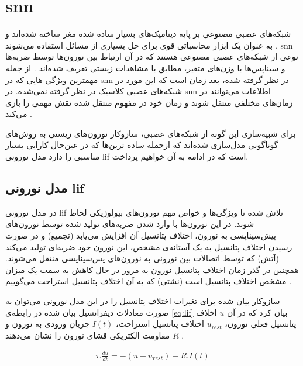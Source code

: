 \documentclass[12pt]{report}
\begin{document}
	
	\section{\gls{snn}}
	شبکه‌های عصبی مصنوعی بر پایه دینامیک‌های بسیار ساده شده مغز ساخته شده‌اند و به عنوان یک ابزار محاسباتی قوی برای حل بسیاری از مسائل استفاده می‌شوند
	\cite{TGNN}. 
	\gls{snn} نوعی از شبکه‌های عصبی مصنوعی هستند که در آن ارتباط بین نورون‌ها توسط ضربه‌ها و سیناپس‌ها  با وزن‌های متغیر، مطابق با مشاهدات زیستی تعریف شده‌اند
	\cite{ghosh2009spiking}. 
	از جمله مهمترین ویژگی هایی که در \gls{snn} در نظر گرفته شده، بعد زمان است
	\cite{Mozafari2019}
	که این مورد در شبکه‌های عصبی کلاسیک در نظر گرفته نمی‌شده. در \gls{snn} اطلاعات می‌توانند در زمان‌های مختلفی منتقل شوند و زمان خود در مفهوم منتقل شده نقش مهمی را بازی می‌کند
	\cite{SNN1997}.
	
	برای شبیه‌سازی این گونه از شبکه‌های عصبی، سازوکار نورون‌های زیستی به روش‌‌های گوناگونی مدل‌سازی شده‌اند که ازجمله ساده ترین‌ها که در عین‌حال کارایی بسیار مناسبی را دارد مدل نورونی \gls{lif} است که در ادامه به آن خواهیم پرداخت.
	
	
	\subsection{مدل نورونی \gls{lif}}
	در مدل نورونی \gls{lif} تلاش شده تا ویژگی‌ها و خواص مهم نورون‌های بیولوژیکی لحاظ شوند. در این نورون‌ها با وارد شدن ضربه‌های تولید شده توسط نورون‌های پیش‌سیناپسی به نورون، اختلاف پتانسیل آن افزایش می‌یابد (تجمیع) و در صورت رسیدن اختلاف پتانسیل به یک آستانه‌ی مشخص، این نورون خود ضربه‌ای تولید می‌کند (آتش) که توسط اتصالات بین نورونی به نورون‌های پس‌سیناپسی منتقل می‌شوند. همچنین در گذر زمان اختلاف پتانسیل نورون به مرور در حال کاهش به سمت یک میزان مشخص اختلاف پتانسیل است (نشتی) که به آن اختلاف پتانسیل استراحت می‌گوییم
	\cite{gerstner2014neuronal}.
	
	ساز‌وکار بیان شده برای تغیرات اختلاف پتانسیل را در این مدل نورونی می‌توان به صورت معادلات دیفرانسیل بیان شده در رابطه‌ی \ref{eq:lif} بیان کرد که در آن $u$ اخلاف پتانسیل فعلی نورون، $u_{rest}$ اختلاف پتانسیل استراحت، $I(t)$ جریان ورودی به نورون و $R$ مقاومت الکتریکی قشای نورون را نشان می‌دهند
	\cite{gerstner2014neuronal}.
	
	\begin{align}
		\tau . \frac{du}{dt} = -(u - u_{rest}) + R . I(t) 
		\label{eq:lif}
	\end{align}
\end{document}
